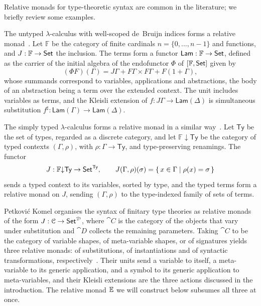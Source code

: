 Relative monads for type-theoretic syntax are common in the literature; we briefly review some examples.

\begin{example}
    The untyped $\lambda$-calculus with well-scoped de~Bruijn indices forms a relative monad~\cite[Ex.~2.4]{AltenkirchChapmanUustalu2015}. Let $\mathbb{F}$ be the category of finite cardinals $n = \{0, \ldots, n - 1\}$ and functions, and $J : \mathbb{F} \to \mathsf{Set}$ the inclusion. The terms form a functor $\mathsf{Lam} : \mathbb{F} \to \mathsf{Set}$, defined as the carrier of the initial algebra of the endofunctor $\Phi$ of $[\mathbb{F}, \mathsf{Set}]$ given by
    \[
    (\Phi F)(\Gamma) = J\Gamma + F\Gamma \times F\Gamma + F(1 + \Gamma),
    \]
    whose summands correspond to variables, applications and abstractions, the body of an abstraction being a term over the extended context. The unit includes variables as terms, and the Kleisli extension of $f : J\Gamma \to \mathsf{Lam}(\Delta)$ is simultaneous substitution $f^\sharp : \mathsf{Lam}(\Gamma) \to \mathsf{Lam}(\Delta)$.
\end{example}

\begin{example}
    The simply typed $\lambda$-calculus forms a relative monad in a similar way~\cite[Ex.~2.5]{AltenkirchChapmanUustalu2015}. Let $\mathsf{Ty}$ be the set of types, regarded as a discrete category, and let $\mathbb{F}{\downarrow}\mathsf{Ty}$ be the category of typed contexts $(\Gamma, \rho)$, with $\rho : \Gamma \to \mathsf{Ty}$, and type-preserving renamings. The functor
    \[
    J : \mathbb{F}{\downarrow}\mathsf{Ty} \to \mathsf{Set}^{\mathsf{Ty}}, \qquad J(\Gamma, \rho)(\sigma) = \{\, x \in \Gamma \mid \rho(x) = \sigma \,\}
    \]
    sends a typed context to its variables, sorted by type, and the typed terms form a relative monad on $J$, sending $(\Gamma, \rho)$ to the type-indexed family of sets of terms.
\end{example}

\begin{example}
    Petković Komel organises the syntax of finitary type theories as relative monads of the form $J : \mathcal{C} \to \mathsf{Set}^{\mathcal{D}}$, where $\cat{C}$ is the category of the objects that vary under substitution and $\cat{D}$ collects the remaining parameters. Taking $\cat{C}$ to be the category of variable shapes, of meta-variable shapes, or of signatures yields three relative monads: of substitutions, of instantiations and of syntactic transformations, respectively~\cite[\S\S7.2, 7.3 and 8.3]{PetkovicKomel2021}. Their units send a variable to itself, a meta-variable to its generic application, and a symbol to its generic application to meta-variables, and their Kleisli extensions are the three actions discussed in the introduction. The relative monad $\mathbb{E}$ we will construct below subsumes all three at once.
\end{example}

